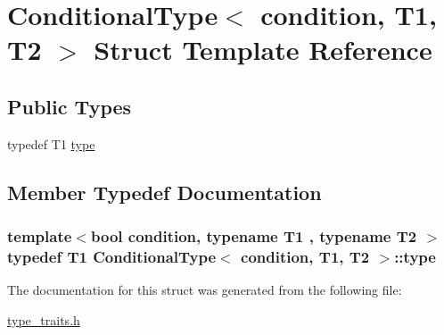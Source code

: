 \hypertarget{struct_conditional_type}{}\section{Conditional\+Type$<$ condition, T1, T2 $>$ Struct Template Reference}
\label{struct_conditional_type}
\subsection*{Public Types}
\begin{DoxyCompactItemize}
\item 
typedef T1 \hyperlink{struct_conditional_type_a40357908ab625ae9868cab516156c946}{type}
\end{DoxyCompactItemize}


\subsection{Member Typedef Documentation}
\subsubsection[{\texorpdfstring{type}{type}}]{\setlength{\rightskip}{0pt plus 5cm}template$<$bool condition, typename T1 , typename T2 $>$ typedef T1 {\bf Conditional\+Type}$<$ condition, T1, T2 $>$\+::{\bf type}}\hypertarget{struct_conditional_type_a40357908ab625ae9868cab516156c946}{}\label{struct_conditional_type_a40357908ab625ae9868cab516156c946}


The documentation for this struct was generated from the following file\+:\begin{DoxyCompactItemize}
\item 
\hyperlink{type__traits_8h}{type\+\_\+traits.\+h}\end{DoxyCompactItemize}
